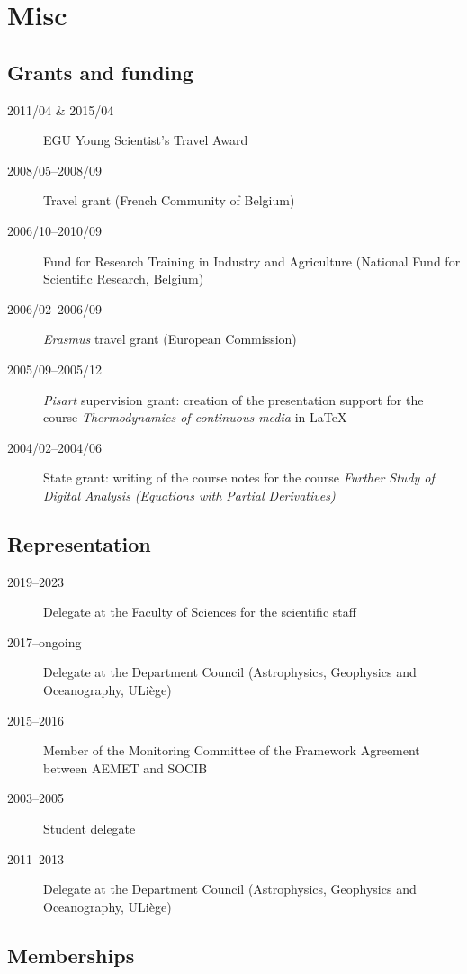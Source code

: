 \documentclass[10pt,a4paper,svgnames]{article}
\begin{document}
\section{Misc}

\subsection{Grants and funding}

\begin{description}
\item[2011/04 \& 2015/04] EGU Young Scientist's Travel Award
\item[2008/05--2008/09] Travel grant (French Community of Belgium)
\item[2006/10--2010/09] Fund for Research Training in Industry and Agriculture (National Fund for Scientific Research, Belgium)
\item[2006/02--2006/09] \textit{Erasmus} travel grant (European Commission)
\item[2005/09--2005/12] \textit{Pisart} supervision grant: creation of the presentation support for the course \textit{Thermodynamics of continuous media} in LaTeX%
\item[2004/02--2004/06] State grant: writing of the course notes for the course \textit{Further Study of Digital Analysis (Equations with Partial Derivatives)}%
\end{description}

\subsection{Representation}
\begin{description}
\item[2019--2023] Delegate at the Faculty of Sciences for the scientific staff
\item[2017--ongoing] Delegate at the Department Council (Astrophysics, Geophysics and Oceanography, ULi\`{e}ge)
\item[2015--2016] Member of the Monitoring Committee of the Framework Agreement between AEMET and SOCIB
\item[2003--2005] Student delegate 
\item[2011--2013] Delegate at the Department Council (Astrophysics, Geophysics and Oceanography, ULi\`{e}ge)
\end{description}


\subsection{Memberships}
\end{document}
